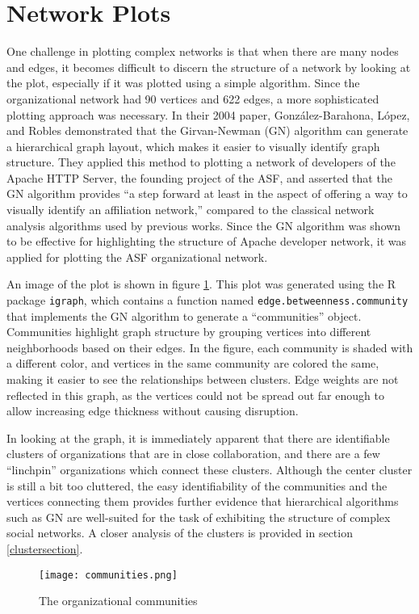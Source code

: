 \section{Network Plots}
One challenge in plotting complex networks is that when there are many nodes and edges, it becomes difficult to discern the structure of a network by looking at the plot, especially if it was plotted using a simple algorithm. Since the organizational network had 90 vertices and 622 edges, a more sophisticated plotting approach was necessary. In their 2004 paper\cite{gonzalez2004community}, Gonz{\'a}lez-Barahona, L{\'o}pez, and Robles demonstrated that the Girvan-Newman (GN) algorithm can generate a hierarchical graph layout, which makes it easier to visually identify graph structure. They applied this method to plotting a network of developers of the Apache HTTP Server, the founding project of the ASF, and asserted that the GN algorithm provides ``a step forward at least in the aspect of offering a way to visually identify an affiliation network,'' compared to the classical network analysis algorithms used by previous works. Since the GN algorithm was shown to be effective for highlighting the structure of Apache developer network, it was applied for plotting the ASF organizational network.

An image of the plot is shown in figure \ref{fig:orgCommunities}. This plot was generated using the R package \verb|igraph|, which contains a function named \verb|edge.betweenness.community| that implements the GN algorithm to generate a ``communities'' object. Communities highlight graph structure by grouping vertices into different neighborhoods based on their edges. In the figure, each community is shaded with a different color, and vertices in the same community are colored the same, making it easier to see the relationships between clusters. Edge weights are not reflected in this graph, as the vertices could not be spread out far enough to allow increasing edge thickness without causing disruption.

In looking at the graph, it is immediately apparent that there are identifiable clusters of organizations that are in close collaboration, and there are a few ``linchpin'' organizations which connect these clusters. Although the center cluster is still a bit too cluttered, the easy identifiability of the communities and the vertices connecting them provides further evidence that hierarchical algorithms such as GN are well-suited for the task of exhibiting the structure of complex social networks. A closer analysis of the clusters is provided in section \ref{clustersection}.
\begin{figure}
	\texttt{[image: communities.png]}
	\centering
	\caption{The organizational communities}
	\label{fig:orgCommunities}
\end{figure}

